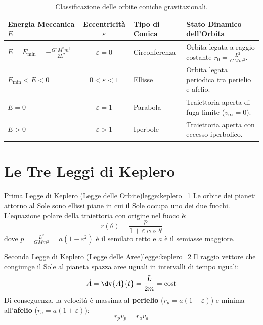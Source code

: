 \begin{table}[htbp]
\centering
\caption{Classificazione delle orbite coniche gravitazionali.}
\label{tab:orbite_coniche}
\begin{tabularx}{\textwidth}{p{4.2cm} c p{2.5cm} X}
\toprule
\textbf{Energia Meccanica $E$} & \textbf{Eccentricità $\varepsilon$} & \textbf{Tipo di Conica} & \textbf{Stato Dinamico dell'Orbita} \\
\midrule
$E = E_{\min} = -\frac{G^2 M^2 m^3}{2 L^2}$ & $\varepsilon = 0$ & Circonferenza & Orbita legata a raggio costante $r_0 = \frac{L^2}{G M m^2}$. \\
$E_{\min} < E < 0$ & $0 < \varepsilon < 1$ & Ellisse & Orbita legata periodica tra perielio e afelio. \\
$E = 0$ & $\varepsilon = 1$ & Parabola & Traiettoria aperta di fuga limite ($v_\infty = 0$). \\
$E > 0$ & $\varepsilon > 1$ & Iperbole & Traiettoria aperta con eccesso iperbolico. \\
\bottomrule
\end{tabularx}
\end{table}

\section{Le Tre Leggi di Keplero}
\label{sec:leggi_keplero}

\begin{legge}{Prima Legge di Keplero (Legge delle Orbite)}{legge:keplero_1}
Le orbite dei pianeti attorno al Sole sono ellissi piane in cui il Sole occupa uno dei due fuochi. L'equazione polare della traiettoria con origine nel fuoco è:
\begin{equation}
    r(\theta) = \frac{p}{1 + \varepsilon \cos\theta}
    \label{eq:orbita_polare}
\end{equation}
dove $p = \frac{L^2}{G M m^2} = a(1 - \varepsilon^2)$ è il semilato retto e $a$ è il semiasse maggiore.
\end{legge}

\begin{legge}{Seconda Legge di Keplero (Legge delle Aree)}{legge:keplero_2}
Il raggio vettore che congiunge il Sole al pianeta spazza aree uguali in intervalli di tempo uguali:
\begin{equation}
    \dot{A} = \dv{A}{t} = \frac{L}{2m} = \text{cost}
\end{equation}
Di conseguenza, la velocità è massima al \textbf{perielio} ($r_p = a(1-\varepsilon)$) e minima all'\textbf{afelio} ($r_a = a(1+\varepsilon)$):
\begin{equation}
    r_p v_p = r_a v_a
\end{equation}
\end{legge}

